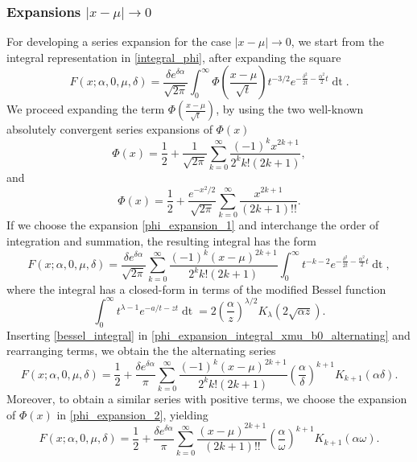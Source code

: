 \documentclass[10pt,a4paper,oneside]{article}
\numberwithin{equation}{section}
\begin{document}
\subsubsection{Expansions $|x-\mu| \to 0$}
For developing a series expansion for the case $|x-\mu| \to 0$, we start from the integral representation in \eqref{integral_phi}, after expanding the square
\begin{equation}\label{integral_phi2}
F(x; \alpha, 0, \mu, \delta) = \frac{\delta e^{\delta \alpha}}{\sqrt{2\pi}} \int_0^{\infty} \Phi\left(\frac{x - \mu}{\sqrt{t}}\right) t^{-3/2} e^{-\frac{\delta^2}{2t} - \frac{\alpha^2}{2}t} \mathop{dt}.
\end{equation}
We proceed expanding the term $\Phi\left(\frac{x-\mu}{\sqrt{t}}\right)$, by using the two well-known absolutely convergent series expansions of $\Phi(x)$ \cite[\S 2]{Lebedev1972}
\begin{equation}\label{phi_expansion_1}
\Phi(x) = \frac{1}{2} + \frac{1}{\sqrt{2\pi}}\sum_{k=0}^{\infty} \frac{(-1)^k x^{2k + 1}}{2^k k! (2k+1)},
\end{equation}
and
\begin{equation}\label{phi_expansion_2}
\Phi(x) = \frac{1}{2} + \frac{e^{-x^2 / 2}}{\sqrt{2\pi}}\sum_{k=0}^{\infty} \frac{x^{2k+1}}{(2k + 1)!!}.
\end{equation}
If we choose the expansion \eqref{phi_expansion_1} and interchange the order of integration and summation, the resulting integral has the form
\begin{equation}\label{phi_expansion_integral_xmu_b0_alternating}
F(x; \alpha, 0, \mu, \delta) = \frac{\delta e^{\delta \alpha}}{\sqrt{2\pi}} \sum_{k=0}^{\infty} \frac{(-1)^k (x-\mu)^{2k + 1}}{2^k k! (2k + 1)}\int_0^{\infty} t^{-k-2} e^{-\frac{\delta^2}{2t} - \frac{\alpha^2}{2}t} \mathop{dt},
\end{equation}
where the integral has a closed-form in terms of the modified Bessel function
\begin{equation}\label{bessel_integral}
\int_0^{\infty} t^{\lambda - 1}e^{-a/t - zt} \mathop{dt} = 2\left(\frac{\alpha}{z}\right)^{\lambda/2} K_{\lambda}(2\sqrt{\alpha z}).
\end{equation}
Inserting \eqref{bessel_integral} in \eqref{phi_expansion_integral_xmu_b0_alternating} and rearranging terms, we obtain the the alternating series
\begin{equation}\label{expansion_xmu_b0_alternating}
F(x; \alpha, 0, \mu, \delta) = \frac{1}{2} + \frac{\delta e^{\delta \alpha}}{\pi}\sum_{k=0}^{\infty} \frac{(-1)^k (x-\mu)^{2k+1}}{2^k k! (2k + 1)} \left(\frac{\alpha}{\delta}\right)^{k+1}K_{k+1}(\alpha \delta).
\end{equation}
Moreover, to obtain a similar series with positive terms, we choose the expansion of $\Phi(x)$ in \eqref{phi_expansion_2}, yielding
\begin{equation}\label{expansion_xmu_b0_positive}
F(x; \alpha, 0, \mu, \delta) = \frac{1}{2} + \frac{\delta e^{\delta \alpha}} {\pi}\sum_{k=0}^{\infty} \frac{(x-\mu)^{2k+1}}{(2k +1)!!} \left(\frac{\alpha}{\omega}\right)^{k+1}K_{k+1}(\alpha \omega).
\end{equation}
\end{document}
